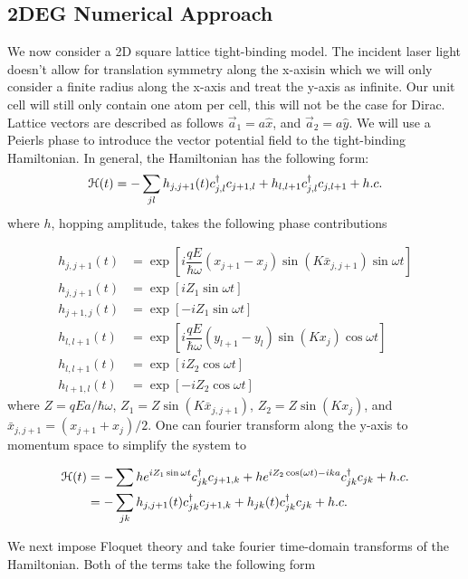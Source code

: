 \subsection{2DEG Numerical Approach}

We now consider a 2D square lattice tight-binding model.
The incident laser light doesn't allow for translation symmetry along the x-axisin which we will only consider a finite radius along the x-axis and treat the y-axis as infinite.
Our unit cell will still only contain one atom per cell, this will not be the case for Dirac.
Lattice vectors are described as follows $\vec{a}_1 = a\hat{x}$, and $\vec{a}_2 = a \hat{y}$.
We will use a Peierls phase to introduce the vector potential field to the tight-binding Hamiltonian.
In general, the Hamiltonian has the following form:
\begin{equation}
  \mathcal{H}(t) = -\sum_{jl} h_{j,j+1}(t) c^{\dagger}_{j,l} c_{j+1,l} + h_{l,l+1} c^{\dagger}_{j,l} c_{j,l+1} + h.c.
\end{equation}
where $h$, hopping amplitude, takes the following phase contributions

\begin{align}
  h_{j,j+1}(t) &= \exp \left[ i \dfrac{qE}{\hbar \omega}(x_{j+1}-x_j) \sin(K\bar{x}_{j,j+1}) \sin{\omega t} \right] \nonumber \\
  h_{j,j+1}(t) &= \exp \left[ i Z_1 \sin{\omega t} \right] \\
  h_{j+1,j}(t) &= \exp \left[ -i Z_1 \sin{\omega t} \right] \\
h_{l,l+1}(t) &= \exp \left[ i \dfrac{qE}{\hbar \omega} (y_{l+1}-y_l) \sin(Kx_j) \cos\omega t \right] \nonumber \\
  h_{l,l+1}(t) &= \exp \left[ i Z_2 \cos\omega t \right] \\
  h_{l+1,l}(t) &= \exp \left[ -i Z_2 \cos\omega t \right]
\end{align}
where $Z = qEa/\hbar \omega$, $Z_1 = Z\sin(K\bar{x}_{j,j+1})$, $Z_2 = Z\sin(Kx_j)$, and $\bar{x}_{j,j+1} = (x_{j+1}+x_j)/2$.
One can fourier transform along the y-axis to momentum space to simplify the system to

\begin{align}
  \mathcal{H}(t) &= -\sum  h e^{iZ_1\sin{\omega t}} c^{\dagger}_{jk} c_{j+1,k} + h e^{ i Z_2 \cos(\omega t) - ika} c^{\dagger}_{jk} c_{jk} + h.c. \nonumber \\
  &= -\sum_{jk} h_{j,j+1}(t) c^{\dagger}_{jk} c_{j+1,k} + h_{jk}(t) c^{\dagger}_{jk} c_{jk} + h.c.
\end{align}

We next impose Floquet theory and take fourier time-domain transforms of the Hamiltonian.
Both of the terms take the following form

